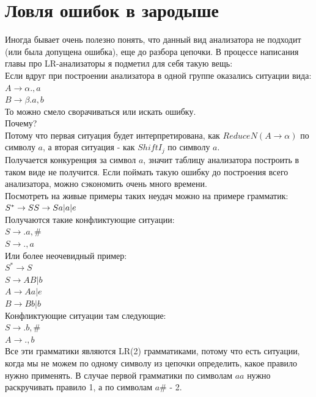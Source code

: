 \documentclass[14pt]{extreport}
\begin{document}
	\section{Ловля ошибок в зародыше}
	Иногда бывает очень полезно понять, что данный вид анализатора не подходит (или была допущена
	ошибка), еще до разбора цепочки. В процессе написания главы про LR-анализаторы я подметил для
	себя такую вещь:\\
	Если вдруг при построении анализатора в одной группе оказались ситуации вида:\\
	$ A \to \alpha . , a$\\
	$ B \to \beta . a , b$\\
	То можно смело сворачиваться или искать ошибку.\\
	Почему?\\
	Потому что первая ситуация будет интерпретирована, как $Reduce N(A \to \alpha )$ по
	символу $a$, а вторая ситуация - как $Shift I_j$ по символу $a$.\\
	Получается конкуренция за символ $a$, значит таблицу анализатора построить в таком виде
	не получится. Если поймать такую ошибку до построения всего анализатора, можно
	сэкономить очень много времени.\\
	Посмотреть на живые примеры таких неудач можно на примере грамматик:\\
	$S^* \to S \\ S \to Sa | a | e$ \\
	Получаются такие конфликтующие ситуации:\\
	$ S \to . a , \#$\\
	$ S \to ., a $\\
	Или более неочевидный пример:\\
	$S^* \to S$ \\
	$S \to AB | b$ \\
	$A \to Aa | e$ \\
	$B \to Bb | b$ \\
	Конфликтующие ситуации там следующие:\\
	$ S \to . b , \# $\\
	$ A \to ., b $\\
	
	Все эти грамматики являются LR(2) грамматиками, потому что есть ситуации, когда мы не
	можем по одному символу из цепочки определить, какое правило нужно применять. В случае
	первой грамматики по символам $aa$ нужно раскручивать правило 1, а по символам $a\#$ - 2.\\
	
\end{document}
